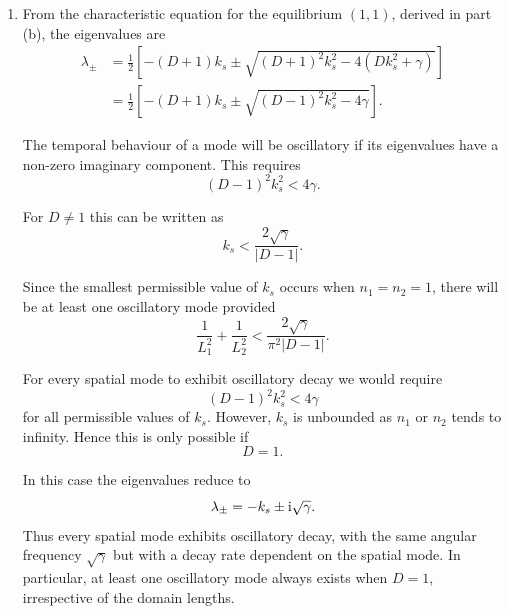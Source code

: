 \documentclass[a4paper,12pt]{article}
\begin{document}
\begin{enumerate}
{\begin{enumerate}[label=(\alph*)]
            \item From the characteristic equation for the
            equilibrium $(1,1)$, derived in part (b), the
            eigenvalues are
            \begin{align*}
                \lambda_{\pm}
                &=\frac{1}{2}\left[-(D+1)k_s
                \pm\sqrt{(D+1)^2k_s^2-4(Dk_s^2+\gamma)}\right]\\
                &=\frac{1}{2}\left[-(D+1)k_s
                \pm\sqrt{(D-1)^2k_s^2-4\gamma}\right].
            \end{align*}

            The temporal behaviour of a mode will be oscillatory
            if its eigenvalues have a non-zero imaginary component.
            This requires
            \begin{equation*}
                (D-1)^2k_s^2<4\gamma.
            \end{equation*}

            For $D\neq 1$ this can be written as
            \begin{equation*}
                k_s<\frac{2\sqrt{\gamma}}{|D-1|}.
            \end{equation*}

            Since the smallest permissible value of $k_s$ occurs
            when $n_1=n_2=1$, there will be at least one
            oscillatory mode provided
            \begin{equation*}
                \boxed{
                    \frac{1}{L_1^2}+\frac{1}{L_2^2}
                    <\frac{2\sqrt{\gamma}}{\pi^2|D-1|}.
                }
            \end{equation*}

            For every spatial mode to exhibit oscillatory decay
            we would require
            \begin{equation*}
                (D-1)^2k_s^2<4\gamma
            \end{equation*}
            for all permissible values of $k_s$. However, $k_s$
            is unbounded as $n_1$ or $n_2$ tends to infinity.
            Hence this is only possible if
            \begin{equation*}
                \boxed{D=1.}
            \end{equation*}

            In this case the eigenvalues reduce to
            \begin{equation*}
                \lambda_{\pm}=-k_s\pm\mathrm{i}\sqrt{\gamma}.
            \end{equation*}
            Thus every spatial mode exhibits oscillatory decay,
            with the same angular frequency $\sqrt{\gamma}$ but
            with a decay rate dependent on the spatial mode.
            In particular, at least one oscillatory mode always
            exists when $D=1$, irrespective of the domain lengths.
        \end{enumerate}
    }
\end{enumerate}
\end{document}
